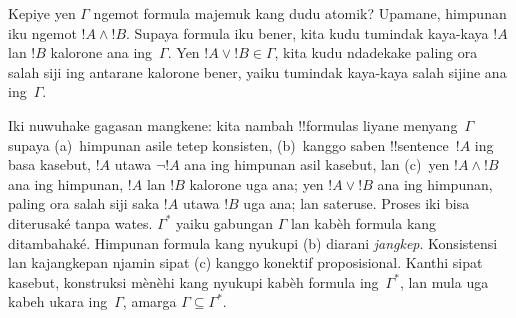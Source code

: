 \documentclass[../../../include/open-logic-section]{subfiles}
\begin{document}
Kepiye yen $\Gamma$ ngemot formula majemuk kang dudu atomik? Upamane,
himpunan iku ngemot $!A \land !B$. Supaya formula iku bener, kita kudu
tumindak kaya-kaya $!A$ lan $!B$ kalorone ana ing~$\Gamma$. Yen
$!A \lor !B \in \Gamma$, kita kudu ndadekake paling ora salah siji
ing antarane kalorone bener, yaiku tumindak kaya-kaya salah sijine ana
ing~$\Gamma$.

Iki nuwuhake gagasan mangkene: kita nambah !!{formula}s liyane
menyang~$\Gamma$ supaya (a)~himpunan asile tetep konsisten,
(b)~kanggo saben !!{sentence}~$!A$ ing basa kasebut, $!A$ utawa
$\lnot !A$ ana ing himpunan asil kasebut, lan (c)~yen $!A \land !B$
ana ing himpunan, $!A$ lan $!B$ kalorone uga ana; yen $!A \lor !B$
ana ing himpunan, paling ora salah siji saka $!A$ utawa $!B$ uga ana;
lan sateruse. Proses iki bisa diterusaké tanpa wates.
$\Gamma^*$ yaiku gabungan $\Gamma$ lan kabèh formula kang ditambahaké.
Himpunan formula kang nyukupi (b) diarani \emph{jangkep}.
Konsistensi lan kajangkepan njamin sipat (c) kanggo konektif
proposisional.  Kanthi sipat kasebut, konstruksi mènèhi
kang nyukupi kabèh formula ing~$\Gamma^*$, lan mula uga kabeh ukara ing~$\Gamma$,
amarga $\Gamma \subseteq \Gamma^*$.
\end{document}
